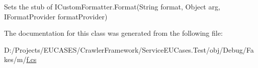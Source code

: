 Sets the stub of I\-Custom\-Formatter.\-Format(\-String format, Object arg, I\-Format\-Provider format\-Provider)



The documentation for this class was generated from the following file\-:\begin{DoxyCompactItemize}
\item 
D\-:/\-Projects/\-E\-U\-C\-A\-S\-E\-S/\-Crawler\-Framework/\-Service\-E\-U\-Cases.\-Test/obj/\-Debug/\-Fakes/m/\hyperlink{m_2f_8cs}{f.\-cs}\end{DoxyCompactItemize}

